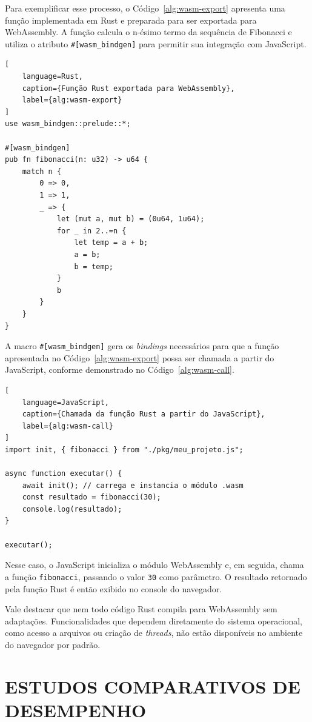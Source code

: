 Para exemplificar esse processo, o Código~\ref{alg:wasm-export} apresenta uma função implementada em Rust e preparada para ser exportada para WebAssembly. A função calcula o n-ésimo termo da sequência de Fibonacci e utiliza o atributo \verb|#[wasm_bindgen]| para permitir sua integração com JavaScript.

\begin{lstlisting}[
    language=Rust,
    caption={Função Rust exportada para WebAssembly},
    label={alg:wasm-export}
]
use wasm_bindgen::prelude::*;

#[wasm_bindgen]
pub fn fibonacci(n: u32) -> u64 {
    match n {
        0 => 0,
        1 => 1,
        _ => {
            let (mut a, mut b) = (0u64, 1u64);
            for _ in 2..=n {
                let temp = a + b;
                a = b;
                b = temp;
            }
            b
        }
    }
}
\end{lstlisting}

A macro \texttt{\#[wasm\_bindgen]} gera os \emph{bindings} necessários para que a função apresentada no Código~\ref{alg:wasm-export} possa ser chamada a partir do JavaScript, conforme demonstrado no Código~\ref{alg:wasm-call}.

\begin{lstlisting}[
    language=JavaScript,
    caption={Chamada da função Rust a partir do JavaScript},
    label={alg:wasm-call}
]
import init, { fibonacci } from "./pkg/meu_projeto.js";

async function executar() {
    await init(); // carrega e instancia o módulo .wasm
    const resultado = fibonacci(30);
    console.log(resultado);
}

executar();
\end{lstlisting}

Nesse caso, o JavaScript inicializa o módulo WebAssembly e, em seguida, chama a função \texttt{fibonacci}, passando o valor \texttt{30} como parâmetro. O resultado retornado pela função Rust é então exibido no console do navegador.

Vale destacar que nem todo código Rust compila para WebAssembly sem adaptações. Funcionalidades que dependem diretamente do sistema operacional, como acesso a arquivos ou criação de \emph{threads}, não estão disponíveis no ambiente do navegador por padrão.

\section{ESTUDOS COMPARATIVOS DE DESEMPENHO}

